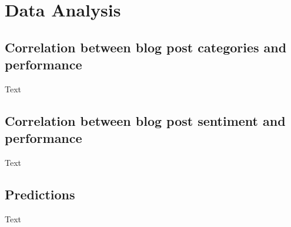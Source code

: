 %
%

\pagebreak
\section{Data Analysis}

\onehalfspacing

\subsection{Correlation between blog post categories and performance}

Text 

\subsection{Correlation between blog post sentiment and performance}

Text

\subsection{Predictions}

Text
